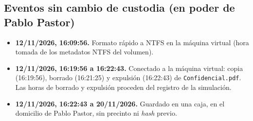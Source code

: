 \documentclass[11pt,a4paper]{article}
\begin{document}
\subsection*{Eventos sin cambio de custodia (en poder de Pablo Pastor)}

\begin{itemize}[leftmargin=1.5em,itemsep=0.4em]
  \item \textbf{12/11/2026, 16:09:56.} Formato rápido a NTFS en la máquina
        virtual (hora tomada de los metadatos NTFS del volumen).
  \item \textbf{12/11/2026, 16:19:56 a 16:22:43.} Conectado a la máquina virtual:
        copia (16:19:56), borrado (16:21:25) y expulsión (16:22:43) de
        \texttt{Confidencial.pdf}. Las horas de borrado y expulsión proceden del
        registro de la simulación.
  \item \textbf{12/11/2026, 16:22:43 a 20/11/2026.} Guardado en una caja, en el
        domicilio de Pablo Pastor, sin precinto ni \textit{hash} previo.
\end{itemize}
\end{document}
